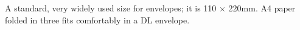 A standard, very widely used size for envelopes; it is 110 \ensuremath{ \times } 220mm.
A4 paper folded in three fits comfortably in a DL envelope.